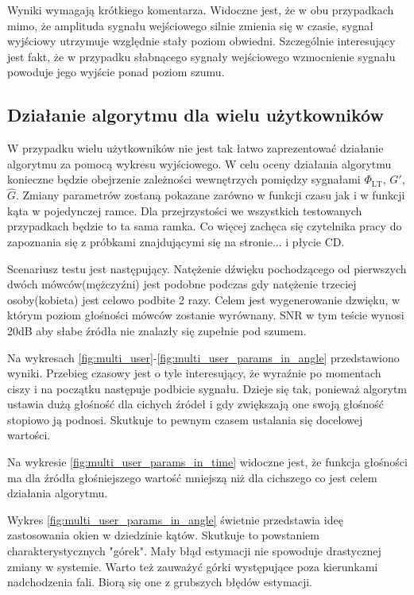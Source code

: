 \noindent Wyniki wymagają krótkiego komentarza. Widoczne jest, że w obu przypadkach mimo, że amplituda sygnału wejściowego silnie zmienia się w czasie, sygnał wyjściowy utrzymuje względnie stały poziom obwiedni. Szczególnie interesujący jest fakt, że w przypadku słabnącego sygnały wejściowego wzmocnienie sygnału powoduje jego wyjście ponad poziom szumu.

\subsection{Działanie algorytmu dla wielu użytkowników}

W przypadku wielu użytkowników nie jest tak łatwo zaprezentować działanie algorytmu za pomocą wykresu wyjściowego. W celu oceny działania algorytmu konieczne będzie obejrzenie zależności wewnętrzych pomiędzy sygnałami $\Phi_{\mathrm{LT}}$, $G'$, $\widehat{G}$. Zmiany parametrów zostaną pokazane zarówno w funkcji czasu jak i w funkcji kąta w pojedynczej ramce. Dla przejrzystości we wszystkich testowanych przypadkach będzie to ta sama ramka. Co więcej zachęca się czytelnika pracy do zapoznania się z próbkami znajdującymi się na stronie... i płycie CD.

\noindent Scenariusz testu jest następujący. Natężenie dźwięku pochodzącego od pierwszych dwóch mówców(mężczyźni) jest podobne podczas gdy natężenie trzeciej osoby(kobieta) jest celowo podbite 2 razy. Celem jest wygenerowanie dzwięku, w którym poziom głośności mówców zostanie wyrównany. SNR w tym teście wynosi 20dB aby słabe źródła nie znalazły się zupełnie pod szumem.

\noindent Na wykresach \ref{fig:multi_user}-\ref{fig:multi_user_params_in_angle} przedstawiono wyniki. Przebieg czasowy jest o tyle interesujący, że wyraźnie po momentach ciszy i na początku następuje podbicie sygnału. Dzieje się tak, ponieważ algorytm ustawia dużą głośność dla cichych źródeł i gdy zwiększają one swoją głośność stopiowo ją podnosi. Skutkuje to pewnym czasem ustalania się docelowej wartości.

\noindent Na wykresie \ref{fig:multi_user_params_in_time} widoczne jest, że funkcja głośności ma dla źródła głośniejszego wartość mniejszą niż dla cichszego co jest celem działania algorytmu.

\noindent Wykres \ref{fig:multi_user_params_in_angle} świetnie przedstawia ideę zastosowania okien w dziedzinie kątów. Skutkuje to powstaniem charakterystycznych "górek". Mały błąd estymacji nie spowoduje drastycznej zmiany w systemie. Warto też zauważyć górki występujące poza kierunkami nadchodzenia fali. Biorą się one z grubszych błędów estymacji.

